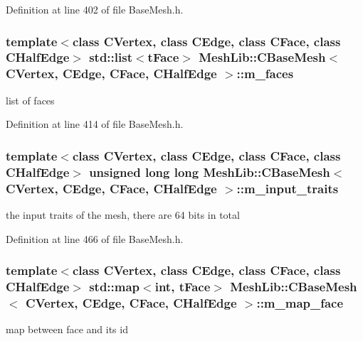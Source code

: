 Definition at line 402 of file Base\+Mesh.\+h.

\subsubsection[{\texorpdfstring{m\+\_\+faces}{m_faces}}]{\setlength{\rightskip}{0pt plus 5cm}template$<$class C\+Vertex, class C\+Edge, class C\+Face, class C\+Half\+Edge$>$ std\+::list$<${\bf t\+Face}$>$ {\bf Mesh\+Lib\+::\+C\+Base\+Mesh}$<$ {\bf C\+Vertex}, {\bf C\+Edge}, {\bf C\+Face}, {\bf C\+Half\+Edge} $>$\+::m\+\_\+faces\hspace{0.3cm}{\ttfamily [protected]}}\hypertarget{class_mesh_lib_1_1_c_base_mesh_a4699846e3f577e064c3b871183d8ba0a}{}\label{class_mesh_lib_1_1_c_base_mesh_a4699846e3f577e064c3b871183d8ba0a}
list of faces 

Definition at line 414 of file Base\+Mesh.\+h.

\subsubsection[{\texorpdfstring{m\+\_\+input\+\_\+traits}{m_input_traits}}]{\setlength{\rightskip}{0pt plus 5cm}template$<$class C\+Vertex, class C\+Edge, class C\+Face, class C\+Half\+Edge$>$ unsigned long long {\bf Mesh\+Lib\+::\+C\+Base\+Mesh}$<$ {\bf C\+Vertex}, {\bf C\+Edge}, {\bf C\+Face}, {\bf C\+Half\+Edge} $>$\+::m\+\_\+input\+\_\+traits\hspace{0.3cm}{\ttfamily [static]}}\hypertarget{class_mesh_lib_1_1_c_base_mesh_a09dbf8905e5b0dbe3c8353070f83ae81}{}\label{class_mesh_lib_1_1_c_base_mesh_a09dbf8905e5b0dbe3c8353070f83ae81}
the input traits of the mesh, there are 64 bits in total 

Definition at line 466 of file Base\+Mesh.\+h.

\subsubsection[{\texorpdfstring{m\+\_\+map\+\_\+face}{m_map_face}}]{\setlength{\rightskip}{0pt plus 5cm}template$<$class C\+Vertex, class C\+Edge, class C\+Face, class C\+Half\+Edge$>$ std\+::map$<$int, {\bf t\+Face}$>$ {\bf Mesh\+Lib\+::\+C\+Base\+Mesh}$<$ {\bf C\+Vertex}, {\bf C\+Edge}, {\bf C\+Face}, {\bf C\+Half\+Edge} $>$\+::m\+\_\+map\+\_\+face\hspace{0.3cm}{\ttfamily [protected]}}\hypertarget{class_mesh_lib_1_1_c_base_mesh_afdcd24f68c0ab83a6b172a64753b7482}{}\label{class_mesh_lib_1_1_c_base_mesh_afdcd24f68c0ab83a6b172a64753b7482}
map between face and its id 

